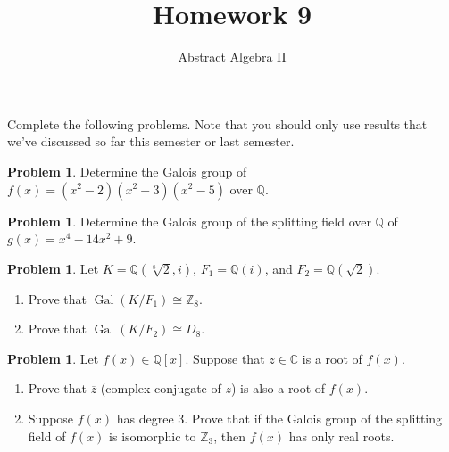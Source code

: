 \documentclass[11pt]{scrartcl}
\theoremstyle{definition}
\newtheorem{problem}[theorem]{Problem}
\DeclareMathOperator{\Gal}{Gal}
\begin{document}
\title{Homework 9}
\subtitle{Abstract Algebra II}
\date{}

\maketitle
\thispagestyle{fancy}

Complete the following problems. Note that you should only use results that we've discussed so far this semester or last semester.

\begin{problem}
Determine the Galois group of $f(x)=(x^2-2)(x^2-3)(x^2-5)$ over $\mathbb{Q}$.
\end{problem}

\begin{problem}
Determine the Galois group of the splitting field over $\mathbb{Q}$ of $g(x)=x^4-14x^2+9$.
\end{problem}

\begin{problem}
Let $K=\mathbb{Q}(\sqrt[8]{2},i)$, $F_1=\mathbb{Q}(i)$, and $F_2=\mathbb{Q}(\sqrt{2})$.
\begin{enumerate}[label=\rm{(\alph*)}]
\item Prove that $\Gal(K/F_1)\cong \mathbb{Z}_8$.
\item Prove that $\Gal(K/F_2)\cong D_8$.
\end{enumerate}
\end{problem}

\begin{problem}
Let $f(x) \in \mathbb{Q}[x]$. Suppose that $z\in\mathbb{C}$ is a root of $f(x)$. 
\begin{enumerate}[label=\rm{(\alph*)}]
\item Prove that $\overline{z}$ (complex conjugate of $z$) is also a root of $f(x)$.
\item Suppose $f(x)$ has degree 3. Prove that if the Galois group of the splitting field of $f(x)$ is isomorphic to $\mathbb{Z}_3$, then $f(x)$ has only real roots.
\end{enumerate}
\end{problem}
\end{document}
